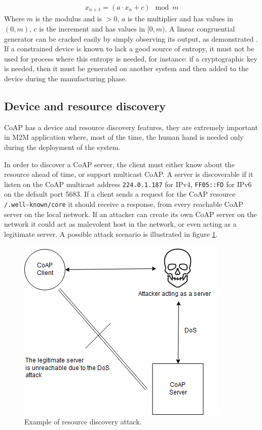 	\begin{align*}
	x_{n+1}=(a\cdot x_n+c)\mod m
	\end{align*}
	Where $m$ is the modulus and is $>0$, $a$ is the multiplier and has values in $(0,m)$, $c$ is the increment and has values in $[0,m)$.
	A linear congruential generator can be cracked easily by simply observing its output, as demonstrated \cite{rng}. \newline
	If a constrained device is known to lack a good source of entropy, it must not be used for process where this entropy is needed, for instance: if a cryptographic key is needed, then it must be generated on another system and then added to the device during the manufacturing phase.
	
	\subsection{Device and resource discovery}
	CoAP has a device and resource discovery features, they are extremely important in M2M application where, most of the time, the human hand is needed only during the deployment of the system.\newline
	
	In order to discover a CoAP server, the client must either know about the resource ahead of time, or support multicast CoAP.\newline
	A server is discoverable if it listen on the CoAP multicast address \texttt{224.0.1.187} for IPv4, \texttt{FF05::FD} for IPv6 on the default port 5683.\newline
	If a client sends a request for the CoAP resource \texttt{/.well-known/core} it should receive a response, from every reachable CoAP server on the local network.
	If an attacker can create its own CoAP server on the network it could act as malevolent host in the network, or even acting as a legitimate server.
	A possible attack scenario is illustrated in figure \ref{fig:coap-vuln5}.
	
	\begin{figure}
		\includegraphics[width=\linewidth]{coap-vuln-img5.png}
		\caption{Example of resource discovery attack.}
		\label{fig:coap-vuln5}
	\end{figure}
	
